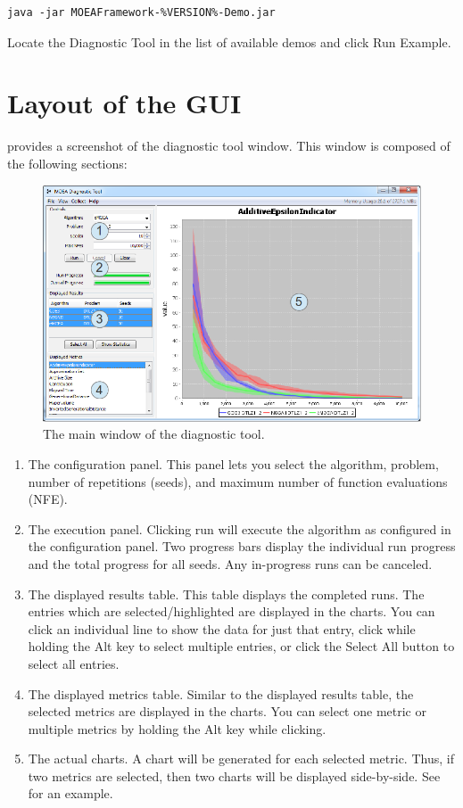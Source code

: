 \begin{lstlisting}[language=Plaintext]
java -jar MOEAFramework-%VERSION%-Demo.jar
\end{lstlisting}

Locate the Diagnostic Tool in the list of available demos and click Run Example.

\section{Layout of the GUI}

 provides a screenshot of the diagnostic tool window.  This window is composed of the following sections:

\begin{figure}
  \includegraphics[width=\linewidth]{diagnosticToolAnnotated.png}
  \caption{The main window of the diagnostic tool.}
  \label{fig:diagnosticToolAnnotated}
\end{figure}

\begin{enumerate}
  \item The configuration panel.  This panel lets you select the algorithm, problem, number of repetitions (seeds), and maximum number of function evaluations (NFE).
  \item The execution panel.  Clicking run will execute the algorithm as configured in the configuration panel.  Two progress bars display the individual run progress and the total progress for all seeds.  Any in-progress runs can be canceled.
  \item The displayed results table.  This table displays the completed runs.  The entries which are selected/highlighted are displayed in the charts.  You can click an individual line to show the data for just that entry, click while holding the Alt key to select multiple entries, or click the Select All button to select all entries.
  \item The displayed metrics table.  Similar to the displayed results table, the selected metrics are displayed in the charts.  You can select one metric or multiple metrics by holding the Alt key while clicking.
  \item The actual charts.  A chart will be generated for each selected metric.  Thus, if two metrics are selected, then two charts will be displayed side-by-side.  See  for an example.
\end{enumerate}

